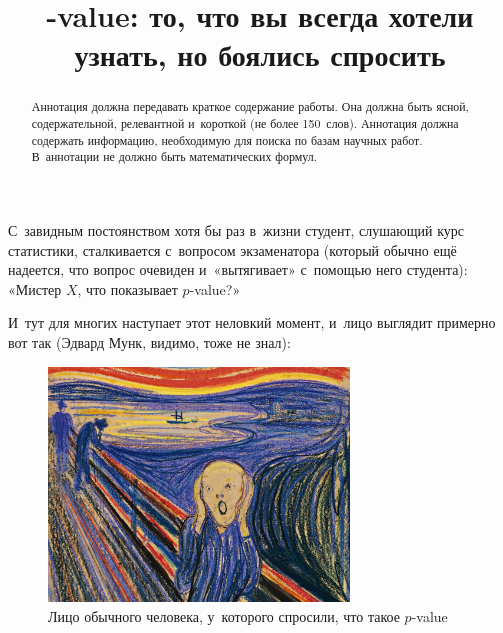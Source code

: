 \documentclass[final,pdftex]{../../template/epsilonj}
\numberwithin{equation}{section}
\begin{document}
	
	\begin{frontmatter}
		\title{-value: то, что вы всегда хотели узнать, но боялись спросить}
		
		\begin{aug}
			\author{ }
			\address{НИУ ВШЭ, Москва.}
		\end{aug}
		
		\begin{abstract}
			Аннотация должна передавать краткое содержание работы.
			Она должна быть ясной, содержательной, релевантной и~короткой
			(не более 150~слов). Аннотация должна содержать информацию,
			необходимую для поиска по базам научных работ. 
			В~аннотации не должно быть математических формул.
		\end{abstract}
		
		\begin{keyword}
		\end{keyword}
		
	\end{frontmatter}
	


С~завидным постоянством хотя бы раз в~жизни студент, слушающий курс статистики, сталкивается с~вопросом экзаменатора (который обычно ещё надеется, что вопрос очевиден и~«вытягивает» с~помощью него студента): «Мистер $X$, что показывает $p$-value?»

И~тут для многих наступает этот неловкий момент, и~лицо выглядит примерно вот так (Эдвард Мунк, видимо, тоже не знал):

\begin{figure}[htbp]
	\centering
	\includegraphics[width=8cm]{munk.jpg}
	\caption{Лицо обычного человека, у~которого спросили, что такое $p$-value}
\end{figure}
\end{document}
